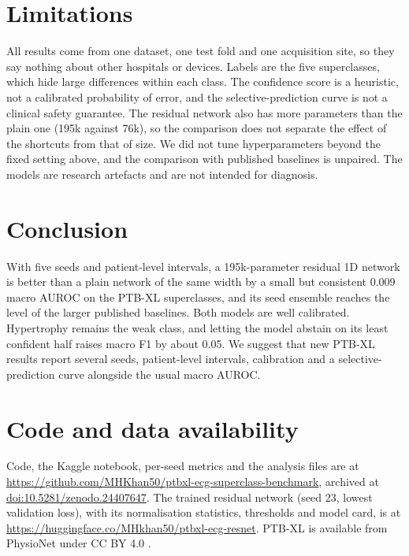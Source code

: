 \documentclass[11pt,a4paper]{article}
\begin{document}
\section{Limitations}

All results come from one dataset, one test fold and one acquisition site, so they say nothing about other
hospitals or devices. Labels are the five superclasses, which hide large differences within each class. The
confidence score is a heuristic, not a calibrated probability of error, and the selective-prediction curve is not a
clinical safety guarantee. The residual network also has more parameters than the plain one (195k against 76k), so the comparison does not
separate the effect of the shortcuts from that of size. We did not tune hyperparameters beyond the fixed setting above, and the comparison with
published baselines is unpaired. The models are research artefacts and are not intended for diagnosis.

\section{Conclusion}

With five seeds and patient-level intervals, a 195k-parameter residual 1D network is better than a plain network of
the same width by a small but consistent 0.009 macro AUROC on the PTB-XL superclasses, and its seed ensemble
reaches the level of the larger published baselines. Both models are well calibrated. Hypertrophy remains the weak class, and letting the model abstain on its least
confident half raises macro F1 by about 0.05. We suggest that new PTB-XL results report several seeds, patient-level
intervals, calibration and a selective-prediction curve alongside the usual macro AUROC.

\section*{Code and data availability}

Code, the Kaggle notebook, per-seed metrics and the analysis files are at
\url{https://github.com/MHKhan50/ptbxl-ecg-superclass-benchmark}, archived at
\href{https://doi.org/10.5281/zenodo.24407647}{doi:10.5281/zenodo.24407647}. The trained residual network (seed 23, lowest
validation loss), with its normalisation statistics, thresholds and model card, is at
\url{https://huggingface.co/MHkhan50/ptbxl-ecg-resnet}. PTB-XL is available from PhysioNet under CC BY 4.0
\citep{wagner2020ptbxl}.



\end{document}
